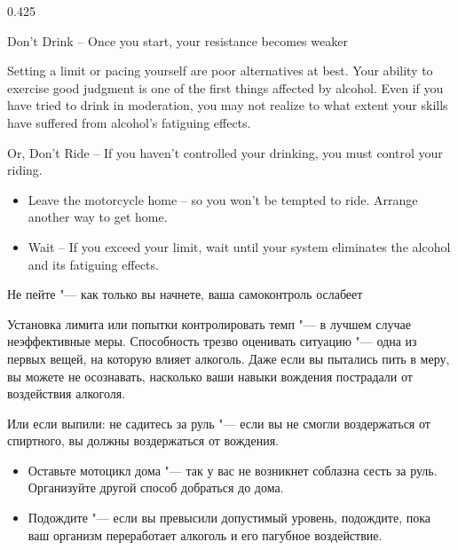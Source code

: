 \begin{langblock}{0.425}
	\begin{eng}
	
	Don't Drink -- Once you start, your resistance becomes weaker
	
	Setting a limit or pacing yourself are poor alternatives at best. Your ability to exercise good judgment is one of the first things affected by alcohol. Even if you have tried to drink in moderation, you may not realize to what extent your skills have suffered from alcohol's fatiguing effects.
	
	
	Or, Don't Ride -- If you haven't controlled your drinking, you must control your riding.
	
	\begin{itemize}[noitemsep]
		\item Leave the motorcycle home -- so you won't be tempted to ride.  Arrange another way to get home.
		\item Wait -- If you exceed your limit, wait until your system eliminates the alcohol and its fatiguing effects.
	\end{itemize}
	\end{eng}
	\begin{rus}
		
	
		Не пейте "--- как только вы начнете, ваша самоконтроль ослабеет
		
		Установка лимита или попытки контролировать темп "--- в лучшем случае неэффективные меры. Способность трезво оценивать ситуацию "--- одна из первых вещей, на которую влияет алкоголь. Даже если вы пытались пить в меру, вы можете не осознавать, насколько ваши навыки  вождения пострадали от воздействия алкоголя.
		
		
		Или если выпили: не садитесь за руль "--- если вы не смогли воздержаться от спиртного, вы должны воздержаться от вождения.
		
		\begin{itemize}[noitemsep]
			\item Оставьте мотоцикл дома "--- так у вас не возникнет соблазна сесть за руль.  Организуйте другой способ добраться до дома.
			\item Подождите "--- если вы превысили допустимый уровень, подождите, пока ваш организм переработает алкоголь и его пагубное воздействие.
		\end{itemize}
\end{rus}
\end{langblock}


